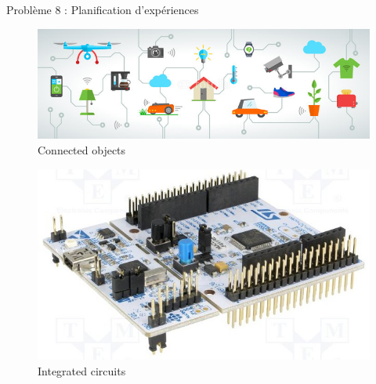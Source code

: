 \documentclass[10pt]{beamer}
\begin{document}
 


\begin{frame}{Problème 8 : Planification d'expériences} 
\begin{minipage}{0.72\textwidth}
\begin{figure} [H] 
\centering
\includegraphics[width=\textwidth, height=0.35\textwidth]{figures/IOT}
\caption*{Connected objects}
\end{figure}
\end{minipage}
\hspace{0.01\linewidth}
\begin{minipage}{0.25\textwidth}
\begin{figure} [H] 
 \centering
\includegraphics[width=\textwidth, height=0.5\textwidth]{figures/ICST.jpg}
\caption*{Integrated circuits}
\end{figure}
\end{minipage}


\end{frame}
\end{document}
